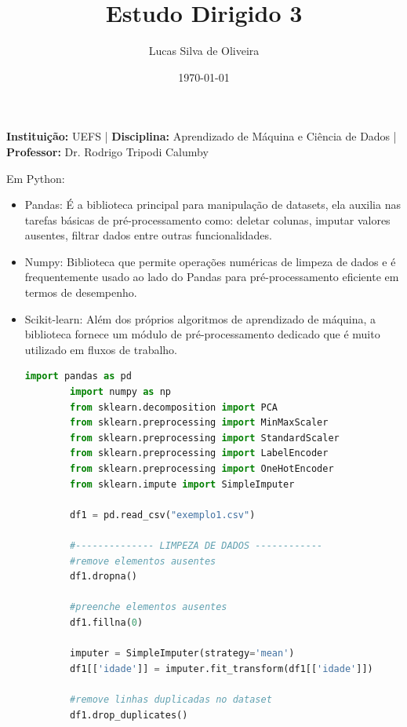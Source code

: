 \documentclass[12pt, a4paper]{article}
\title{\large Estudo Dirigido 3}
\author{\small Lucas Silva de Oliveira}
\date{\small\today}
\begin{document}
\maketitle
\vspace{-0.99cm}  
\begin{center}
\small
\textbf{Instituição:} UEFS \quad | \quad
\textbf{Disciplina:} Aprendizado de Máquina e Ciência de Dados \quad | \quad
\textbf{Professor:} Dr. Rodrigo Tripodi Calumby
\end{center}

Em Python:
\begin{itemize}
    \item Pandas: É a biblioteca principal para manipulação de datasets, ela auxilia nas tarefas básicas de pré-processamento como: deletar colunas, imputar valores ausentes, filtrar dados entre outras funcionalidades.

    \item Numpy: Biblioteca que permite operações numéricas de limpeza de dados e é 
    frequentemente usado ao lado do Pandas para pré-processamento eficiente em 
    termos de desempenho.

    \item Scikit-learn: Além dos próprios algoritmos de aprendizado de máquina, a biblioteca fornece um módulo de pré-processamento dedicado que 
    é muito utilizado em fluxos de trabalho.

    \begin{lstlisting}[language=Python, title = {Exemplo de funções e métodos em Python}]
        import pandas as pd
        import numpy as np
        from sklearn.decomposition import PCA
        from sklearn.preprocessing import MinMaxScaler
        from sklearn.preprocessing import StandardScaler
        from sklearn.preprocessing import LabelEncoder
        from sklearn.preprocessing import OneHotEncoder
        from sklearn.impute import SimpleImputer

        df1 = pd.read_csv("exemplo1.csv")

        #-------------- LIMPEZA DE DADOS ------------
        #remove elementos ausentes
        df1.dropna()

        #preenche elementos ausentes
        df1.fillna(0)

        imputer = SimpleImputer(strategy='mean')
        df1[['idade']] = imputer.fit_transform(df1[['idade']])

        #remove linhas duplicadas no dataset
        df1.drop_duplicates()
   

\end{lstlisting}
\end{itemize}
\end{document}
